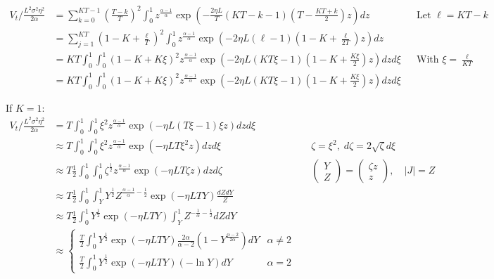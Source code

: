 \documentclass{article}
\begin{document}
\begin{align*}
V_t / \tfrac{L^2 \sigma^2 \eta^2}{2\alpha} &= \sum_{k=0}^{KT-1} \left( \frac{T-k}{T} \right)^2 \int_{0}^{1} z^{\frac{\alpha-1}{\alpha}} \exp\left({-\frac{2\eta L}{T}(KT-k-1)\left(T - \frac{KT+k}{2}\right)z}\right) dz
&&\text{Let }\ell = KT - k\\
&= \sum_{j=1}^{KT} \left( 1 - K + \frac{\ell}{T} \right)^2 \int_{0}^{1} z^{\frac{\alpha-1}{\alpha}} \exp\left({-2\eta L(\ell-1)\left(1 - K + \frac{\ell}{2T}\right)z}\right) dz\\
&=KT\int_{0}^{1} \int_{0}^{1} \left( 1 - K + K\xi \right)^2 z^{\frac{\alpha-1}{\alpha}} \exp\left({-2\eta L(KT\xi-1)\left(1 - K + \frac{K\xi}{2}\right)z}\right)  dz d\xi && \text{With }\xi = \frac{\ell}{KT}
\\&=
KT\int_{0}^{1} \int_{0}^{1} \left( 1 - K + K\xi \right)^2 z^{\frac{\alpha-1}{\alpha}} \exp\left({-2\eta L(KT\xi-1)\left(1 - K + \frac{K\xi}{2}\right)z}\right)  dz d\xi
\end{align*}


If $K=1$:
\begin{align*}
V_t / \tfrac{L^2 \sigma^2 \eta^2}{2\alpha}
&=T
\int_{0}^{1} \int_{0}^{1}  \xi^2  z^{\frac{\alpha-1}{\alpha}} \exp\left({-\eta L(T\xi-1) \xi z}\right)  dz d\xi
\\&\approx T
\int_{0}^{1} \int_{0}^{1}  \xi^2  z^{\frac{\alpha-1}{\alpha}} \exp\left({-\eta LT\xi^2 z}\right)  dz d\xi && \zeta = \xi^2,\; d\zeta = 2\sqrt  \zeta d\xi
\\&\approx T
\frac{1}{2}\int_{0}^{1} \int_{0}^{1}  \zeta^{\frac{1}{2}}  z^{\frac{\alpha-1}{\alpha}} \exp\left({-\eta LT\zeta  z}\right)  dz d\zeta &&
\begin{pmatrix}Y \\ Z\end{pmatrix} = \begin{pmatrix}\zeta z \\ z\end{pmatrix}, \quad |J| = Z
\\&\approx T
\frac{1}{2}\int_{0}^{1} \int_{Y}^{1}  Y^{\frac{1}{2}}  Z^{\frac{\alpha-1}{\alpha}-\frac{1}{2}} \exp\left({-\eta LTY}\right)  \frac{dZdY}{Z}
\\&\approx T
\frac{1}{2}\int_{0}^{1}  Y^{\frac{1}{2}}   \exp\left({-\eta LTY}\right) \int_{Y}^{1} Z^{-\frac{1}{\alpha}-\frac{1}{2}} dZdY
\\&\approx 
\left\{\begin{array}{ll}
    \frac{T}{2}\int_{0}^{1}  Y^{\frac{1}{2}}   \exp\left({-\eta LTY}\right) \frac{2\alpha}{\alpha - 2} \left( 1 - Y^{\frac{\alpha - 2}{2\alpha}} \right) dY & \alpha \neq 2\\
    \frac{T}{2}\int_{0}^{1}  Y^{\frac{1}{2}}   \exp\left({-\eta LTY}\right)  (-\ln Y) dY & \alpha = 2
\end{array}\right.
\end{align*}
\end{document}
